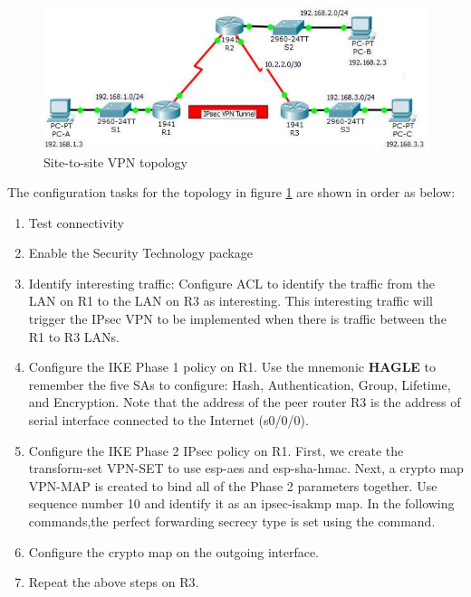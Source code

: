 \begin{figure}[hbtp]
\caption{Site-to-site VPN topology}\label{VPNtopolgy}
\centering
\includegraphics[scale=0.5]{pictures/VPNtopolgy.PNG}
\end{figure}

The configuration tasks for the topology in figure \ref{VPNtopolgy} are shown in order as below:

\begin{enumerate}
\item Test connectivity
\item Enable the Security Technology package
\item Identify interesting traffic: Configure ACL to identify the traffic from the LAN on R1 to the LAN on R3 as interesting. This interesting
traffic will trigger the IPsec VPN to be implemented when there is traffic between the R1 to R3 LANs.
\item Configure the IKE Phase 1 policy on R1. Use the mnemonic \textbf{HAGLE} to remember the five SAs to configure: Hash, Authentication, Group, Lifetime, and Encryption. Note that the address of the peer router R3 is the address of serial interface connected to the Internet (s0/0/0).
\item Configure the IKE Phase 2 IPsec policy on R1. First, we create the transform-set VPN-SET to use esp-aes and esp-sha-hmac. Next, a crypto map VPN-MAP is created to bind all of the Phase 2 parameters together. Use sequence number 10 and identify it as an ipsec-isakmp map. In the following commands,the perfect forwarding secrecy type is set using the  command.
\item Configure the crypto map on the outgoing interface.
\item Repeat the above steps on R3.
\end{enumerate}

